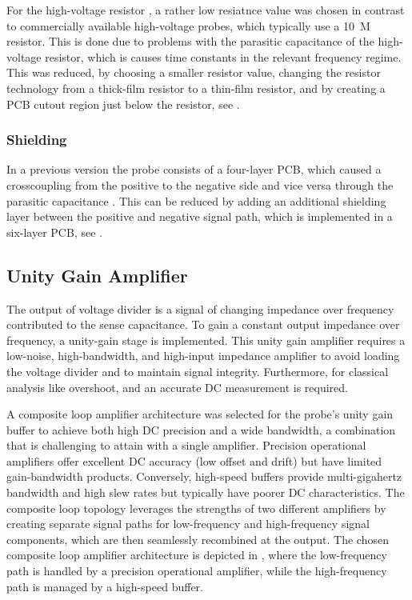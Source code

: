 For the high-voltage resistor , a rather low resiatnce value was chosen in contrast to commercially available high-voltage probes, which typically use a \SI{10}{M\Omega} resistor.
This is done due to problems with the parasitic capacitance  of the high-voltage resistor, which is causes time constants in the relevant frequency regime.
This was reduced, by choosing a smaller resistor value, changing the resistor technology from a thick-film resistor to a thin-film resistor, and by creating a PCB cutout region just below the resistor, see .

\subsubsection*{Shielding}
In a previous version the probe consists of a four-layer PCB, which caused a crosscoupling from the positive to the negative side and vice versa through the parasitic capacitance .
This can be reduced by adding an additional shielding layer between the positive and negative signal path, which is implemented in a six-layer PCB, see .













\subsection{Unity Gain Amplifier}
The output of voltage divider is a signal of changing impedance over frequency contributed to the sense capacitance.
To gain a constant output impedance over frequency, a unity-gain stage is implemented.
This unity gain amplifier requires a low-noise, high-bandwidth, and high-input impedance amplifier to avoid loading the voltage divider and to maintain signal integrity.
Furthermore, for classical analysis like overshoot,  and  an accurate DC measurement is required.



A composite loop amplifier architecture was selected for the probe's unity gain buffer to achieve both high DC precision and a wide bandwidth, a combination that is challenging to attain with a single amplifier. 
Precision operational amplifiers offer excellent DC accuracy (low offset and drift) but have limited gain-bandwidth products. 
Conversely, high-speed buffers provide multi-gigahertz bandwidth and high slew rates but typically have poorer DC characteristics. 
The composite loop topology leverages the strengths of two different amplifiers by creating separate signal paths for low-frequency and high-frequency signal components, which are then seamlessly recombined at the output.
The chosen composite loop amplifier architecture is depicted in , where the low-frequency path is handled by a precision operational amplifier, while the high-frequency path is managed by a high-speed buffer.

